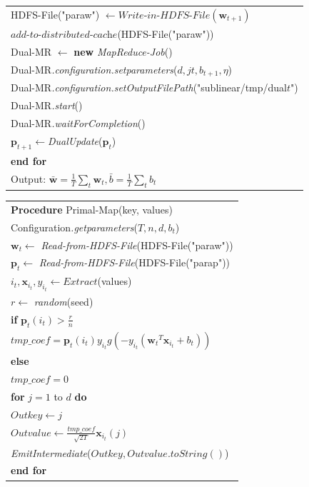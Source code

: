 \documentclass{llncs}
\newcommand{\bw}{\mathbf{w}}
\newcommand{\bp}{\mathbf{p}}
\newcommand{\lc}{\left(}
\newcommand{\rc}{\right)}
\newcommand{\tspace}{\hspace*{2em}}
\begin{document}
\begin{table}[ht]
\begin{tabular}{l}
        \tspace HDFS-File("paraw") $\leftarrow \textit{Write-in-HDFS-File}(\bw_{t+1})$ \\
        \tspace $\textit{add-to-distributed-cache}$(HDFS-File("paraw"))   \\
        \tspace Dual-MR $\leftarrow$ \textbf{new} \textit{MapReduce-Job}() \\
        \tspace Dual-MR\textit{.configuration.setparameters}($d, jt, b_{t+1}, \eta$) \\
        \tspace Dual-MR\textit{.configuration.setOutputFilePath}("sublinear/tmp/dual$t$") \\
        \tspace Dual-MR\textit{.start}() \\
        \tspace Dual-MR\textit{.waitForCompletion}() \\
        \tspace $\bp_{t+1}$$\leftarrow$\textit{DualUpdate}($\bp_t$) \\
        \textbf{end for} \\
        Output: $\bar{\bw}=\frac{1}{T}\sum_{t}{\bw}_{t},\bar{b}=\frac{1}{T}\sum_{t}{b}_{t}$ \\
	\hline
	\end{tabular}
	\end{table}

    \begin{table}[ht]
	\begin{tabular}{l}
	\hline\noalign{\smallskip}
	\textbf{Procedure} Primal-Map(key, values) \\
	\noalign{\smallskip}
	\hline
	\noalign{\smallskip}
        Configuration\textit{.getparameters}($T, n, d, b_t$) \\
        $\bw_t \leftarrow$ \textit{Read-from-HDFS-File}(HDFS-File("paraw")) \\
        $\bp_t \leftarrow$ \textit{Read-from-HDFS-File}(HDFS-File("parap")) \\
        $i_t, \mathbf{x}_{i_t}, y_{i_t} \leftarrow \textit{Extract}$(values)   \\
        $r \leftarrow$ \textit{random}(seed) \\
        \textbf{if} $\bp_t(i_t) > \frac{r}{n}$ \\
        \tspace $tmp\_coef=\bp_t(i_t){y}_{{i}_{t}}g\lc-{y}_{{i}_{t}}\lc {{\bw}_{t}}^{T}{\mathbf{x}}_{i_t}+{b}_{t} \rc\rc$ \\
        \textbf{else} \\
        \tspace $tmp\_coef=0$ \\
        \textbf{for} $j=1$ to $d$ \textbf{do} \\
        \tspace $Outkey \leftarrow j$ \\
        \tspace $Outvalue \leftarrow \frac{tmp\_coef}{\sqrt{2T}}\mathbf{x}_{i_t}(j) $ \\
        \tspace \textit{EmitIntermediate}($Outkey, Outvalue.\textit{toString}()$) \\
        \textbf{end for} \\
	\hline
	\end{tabular}
	\end{table}
\end{document}
